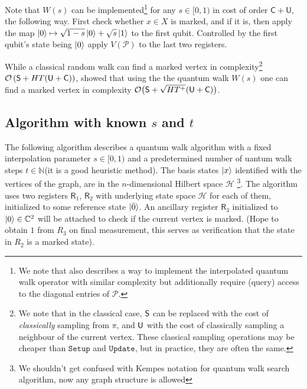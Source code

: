 \documentclass{article}
\newcommand{\Hi}{\mathcal{H}}
\newcommand{\bigO}[1]{\mathcal{O}\left( #1 \right)}
\newcommand{\bigObig}[1]{\mathcal{O}\big( #1 \big)}
\newcommand{\C}{\mathbb{C}}
\newcommand{\N}{\mathbb{N}}
\newcommand{\PM}{\mathcal{P}}
\newcommand{\setup}{\mathtt{Setup}}
\newcommand{\update}{\mathtt{Update}}
\newcommand{\checkingcost}{\mathsf{C}}
\newcommand{\updatecost}{\mathsf{U}}
\newcommand{\Reg}{\mathsf{R}}
\newcommand{\barO}{\bar{0}}
\begin{document}
 Note that $W(s)$ can be implemented\footnote{We note that \cite[Appendix B.2]{krovi2010QWalkFindMarkedAnyGraph} also describes a way to implement the interpolated quantum walk operator with similar complexity but additionally require (query) access to the diagonal entries of $\PM$.} for any $s \in [0,1)$ in cost of order $\checkingcost+\updatecost$, the following way. First check whether $x\in X$ is marked, and if it is, then apply the map $\ket{0}\mapsto \sqrt{1-s}\ket{0} + \sqrt{s}\ket{1}$ to the first qubit. Controlled by the first qubit's state being $\ket{0}$ apply $V(\PM)$ to the last two registers.


 While a classical random walk can find a marked vertex in complexity\footnote{We note that in the classical case, $\sf S$ can be replaced with the cost of \emph{classically} sampling from $\pi$, and $\sf U$ with the cost of classically sampling a neighbour of the current vertex. These classical sampling operations may be cheaper than $\setup$ and $\update$, but in practice, they are often the same.} $\bigO{{\sf S}+HT({\sf U}+{\sf C})}$, showed that using the the quantum walk $W(s)$ one can find a marked vertex in complexity $\bigObig{{\sf S}+\sqrt{HT^+}({\sf U}+{\sf C})}$.

 
\subsection{Algorithm with known $s$ and $t$}
The following algorithm describes a quantum walk algorithm with a fixed interpolation parameter  $ s\in [0,1) $ and a predetermined number of  uantum walk steps $ t \in \N $(it is a good heuristic method).
The basis states $ \ket x $ identified with the vertices of the graph, are in the $n$-dimensional Hilbert space $\Hi$ \footnote{We shouldn't get confused with Kempes notation for quantum walk search algorithm, now any graph structure is allowed}. The algorithm uses two registers $\Reg_1$, $\Reg_2$ with underlying state space $\Hi$ for each of them,  initialized to some reference state $ \ket{\barO} $.
An ancillary register $\Reg_3$ initialized to $\ket{0} \in \C^2$ will be attached to check if the current vertex is marked. (Hope to obtain $1$ from $R_3$ on final measurement, this serves as verification that the state in $R_2$ is a marked state).
\end{document}
